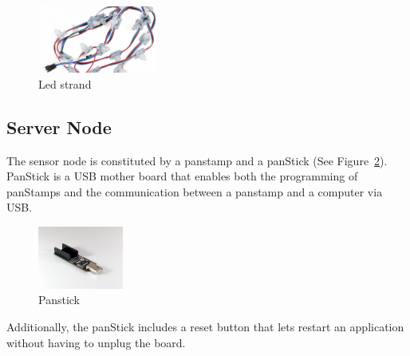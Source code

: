 \begin{figure}[h!] 
 \centering
 \includegraphics[width= 0.35\textwidth, clip=true,keepaspectratio=true]{./pic/led-strand-all.jpeg}
 \caption{Led strand}
 \label{fig:led-strand}
\end{figure}

\subsection{Server Node}
The sensor node is constituted by a panstamp and a panStick (See Figure~\ref{fig:panstick}).
PanStick is a USB mother board that enables both the programming of panStamps and the communication between a panstamp and a computer via USB.

\begin{figure}[h!] 
 \centering
 \includegraphics[width= 0.25\textwidth, clip=true,keepaspectratio=true]{./pic/panStick_01.png}
 \caption{Panstick}
 \label{fig:panstick}
\end{figure}

Additionally, the panStick includes a reset button that lets restart an application without having to unplug the board.